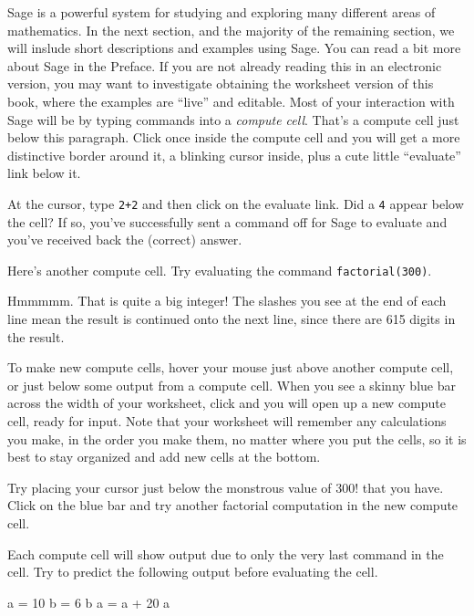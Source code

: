 Sage is a powerful system for studying and exploring many different areas of mathematics.  In the next section, and the majority of the remaining section, we will inslude short descriptions and examples using Sage.  You can read a bit more about Sage in the Preface.  If you are not already reading this in an electronic version, you may want to investigate obtaining the worksheet version of this book, where the examples are ``live'' and editable.
%
Most of your interaction with Sage will be by typing commands into a \emph{compute cell}.  That's a compute cell just below this paragraph.  Click once inside the compute cell and you will get a more distinctive border around it, a blinking cursor inside, plus a cute little ``evaluate'' link below it.\par
%
\begin{sageexample}

\end{sageexample}
%
At the cursor, type \verb?2+2? and then click on the evaluate link.  Did a \verb?4? appear below the cell?  If so, you've successfully sent a command off for Sage to evaluate and you've received back the (correct) answer.\par
%
Here's another compute cell.  Try evaluating the command \verb?factorial(300)?.
%
\begin{sageexample}

\end{sageexample}
%
Hmmmmm.  That is quite a big integer!  The slashes you see at the end of each line mean the result is continued onto the next line, since there are 615 digits in the result.\par
%
To make new compute cells, hover your mouse just above another compute cell, or just below some output from a compute cell.  When you see a skinny blue bar across the width of your worksheet, click and you will open up a new compute cell, ready for input.  Note that your worksheet will remember any calculations you make, in the order you make them, no matter where you put the cells, so it is best to stay organized and add new cells at the bottom.\par
%
Try placing your cursor just below the monstrous value of $300!$ that you have.  Click on the blue bar and try another factorial computation in the new compute cell.\par
%
Each compute cell will show output due to only the very last command in the cell.  Try to predict the following output before evaluating the cell.
%
\begin{sageexample}
a = 10
b = 6
b
a = a + 20
a
\end{sageexample}
